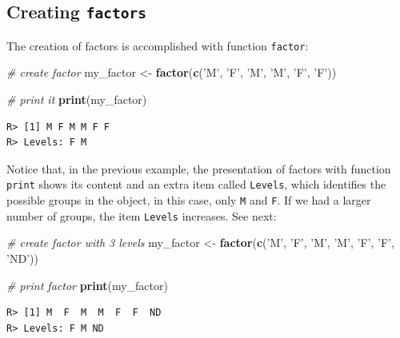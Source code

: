 \documentclass[
  12pt,
]{book}
\newenvironment{Shaded}{\begin{snugshade}}{\end{snugshade}}
\newcommand{\CommentTok}[1]{\textcolor[rgb]{0.37,0.37,0.37}{\textit{#1}}}
\newcommand{\KeywordTok}[1]{\textcolor[rgb]{0.27,0.27,0.27}{\textbf{#1}}}
\newcommand{\NormalTok}[1]{#1}
\newcommand{\StringTok}[1]{\textcolor[rgb]{0.5,0.5,0.5}{#1}}
\begin{document}
\hypertarget{creating-factors}{%
\subsection{\texorpdfstring{Creating \texttt{factors}}{Creating factors}}\label{creating-factors}}

The creation of factors is accomplished with function \texttt{factor}: 

\begin{Shaded}
\begin{Highlighting}[]
\CommentTok{# create factor}
\NormalTok{my_factor <-}\StringTok{ }\KeywordTok{factor}\NormalTok{(}\KeywordTok{c}\NormalTok{(}\StringTok{'M'}\NormalTok{, }\StringTok{'F'}\NormalTok{, }\StringTok{'M'}\NormalTok{,}
                      \StringTok{'M'}\NormalTok{, }\StringTok{'F'}\NormalTok{, }\StringTok{'F'}\NormalTok{))}

\CommentTok{# print it}
\KeywordTok{print}\NormalTok{(my_factor)}
\end{Highlighting}
\end{Shaded}

\begin{verbatim}
R> [1] M F M M F F
R> Levels: F M
\end{verbatim}

Notice that, in the previous example, the presentation of factors with function \texttt{print} shows its content and an extra item called \texttt{Levels}, which identifies the possible groups in the object, in this case, only \texttt{M} and \texttt{F}. If we had a larger number of groups, the item \texttt{Levels} increases. See next: 

\begin{Shaded}
\begin{Highlighting}[]
\CommentTok{# create factor with 3 levels}
\NormalTok{my_factor <-}\StringTok{ }\KeywordTok{factor}\NormalTok{(}\KeywordTok{c}\NormalTok{(}\StringTok{'M'}\NormalTok{, }\StringTok{'F'}\NormalTok{, }\StringTok{'M'}\NormalTok{, }
                      \StringTok{'M'}\NormalTok{, }\StringTok{'F'}\NormalTok{, }\StringTok{'F'}\NormalTok{,}
                      \StringTok{'ND'}\NormalTok{))}

\CommentTok{# print factor}
\KeywordTok{print}\NormalTok{(my_factor)}
\end{Highlighting}
\end{Shaded}

\begin{verbatim}
R> [1] M  F  M  M  F  F  ND
R> Levels: F M ND
\end{verbatim}
\end{document}

